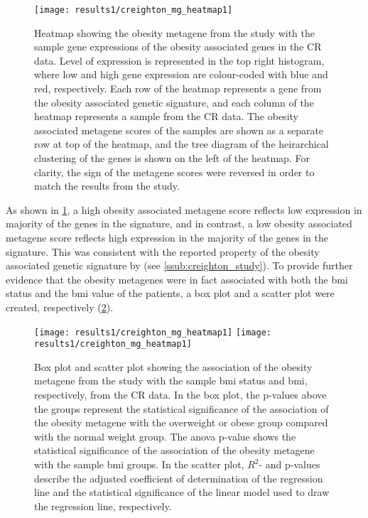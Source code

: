 \begin{figure}[tb!]
	\centering
	\texttt{[image: results1/creighton\_mg\_heatmap1]}
	\caption[Obesity metagene from \citet{Creighton2012} study and sample gene expression in CR data] {Heatmap showing the obesity metagene from the \citet{Creighton2012} study with the sample gene expressions of the obesity associated genes in the CR data.
	Level of expression is represented in the top right histogram, where low and high gene expression are colour-coded with blue and red, respectively.
	Each row of the heatmap represents a gene from the obesity associated genetic signature, and each column of the heatmap represents a sample from the CR data.
	The obesity associated metagene scores of the samples are shown as a separate row at top of the heatmap, and the tree diagram of the heirarchical clustering of the genes is shown on the left of the heatmap.
	For clarity, the sign of the metagene scores were reversed in order to match the results from the \citet{Creighton2012} study.}
	\label{fig:crmetaheat}
\end{figure}

As shown in \cref{fig:crmetaheat}, a high obesity associated metagene score  reflects low expression in majority of the genes in the signature, and in contrast, a low obesity associated metagene score reflects high expression in the majority of the genes in the signature.
This was consistent with the reported property of the obesity associated genetic signature by \citet{Creighton2012} (see \cref{ssub:creighton_study}).
To provide further evidence that the obesity metagenes were in fact associated with both the \gls{bmi} status and the \gls{bmi} value of the patients, a box plot and a scatter plot were created, respectively (\cref{fig:crmetaboxplot}).

\begin{figure}[tb!]
	\centering
	\texttt{[image: results1/creighton\_mg\_heatmap1]}
	\hfill
	\texttt{[image: results1/creighton\_mg\_heatmap1]}
	\caption[Obesity metagene from the \citet{Creighton2012} study and sample \gls{bmi}/\gls{bmi} status in CR data]{Box plot and scatter plot showing the association of the obesity metagene from the \citet{Creighton2012} study with the sample \gls{bmi} status and \gls{bmi}, respectively, from the CR data.
	In the box plot, the p-values above the groups represent the statistical significance of the association of the obesity metagene with the overweight or obese group compared with the normal weight group.
	The \gls{anova} p-value shows the statistical significance of the association of the obesity metagene with the sample \gls{bmi} groups.
	In the scatter plot, $R^2$- and p-values describe the adjusted coefficient of determination of the regression line and the statistical significance of the linear model used to draw the regression line, respectively.}
	\label{fig:crmetaboxplot}
\end{figure}

